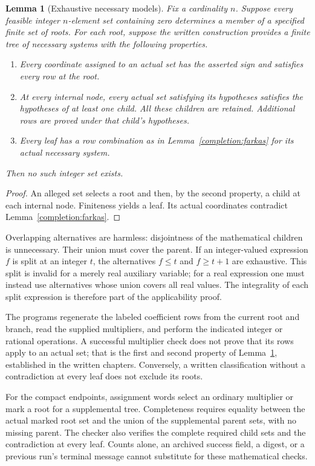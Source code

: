 \documentclass[11pt,a4paper]{article}
\newtheorem{lemma}[theorem]{Lemma}
\theoremstyle{remark}
\begin{document}
\begin{lemma}[Exhaustive necessary models]\label{completion:coverage}
Fix a cardinality $n$. Suppose every feasible integer $n$-element set
containing zero determines a member of a specified finite set of roots.
For each root, suppose the written construction provides a finite tree
of necessary systems with the following properties.
\begin{enumerate}
\item Every coordinate assigned to an actual set has the asserted sign
and satisfies every row at the root.
\item At every internal node, every actual set satisfying its hypotheses
satisfies the hypotheses of at least one child. All these children are
retained. Additional rows are proved under that child's hypotheses.
\item Every leaf has a row combination as in
Lemma~\ref{completion:farkas} for its actual necessary system.
\end{enumerate}
Then no such integer set exists.
\end{lemma}
\begin{proof}
An alleged set selects a root and then, by the second property, a child
at each internal node. Finiteness yields a leaf. Its actual coordinates
contradict Lemma~\ref{completion:farkas}.
\end{proof}

Overlapping alternatives are harmless: disjointness of the mathematical
children is unnecessary. Their union must cover the parent. If an
integer-valued expression $f$ is split at an integer $t$, the alternatives
$f\le t$ and $f\ge t+1$ are exhaustive. This split is invalid for a merely
real auxiliary variable; for a real expression one must instead use
alternatives whose union covers all real values. The integrality of each
split expression is therefore part of the applicability proof.

The programs regenerate the labeled coefficient rows from the current
root and branch, read the supplied multipliers, and perform the indicated
integer or rational operations. A successful multiplier check does not
prove that its rows apply to an actual set; that is the first and second
property of Lemma~\ref{completion:coverage}, established in the written
chapters. Conversely, a written classification without a contradiction
at every leaf does not exclude its roots.

For the compact endpoints, assignment words select an ordinary multiplier
or mark a root for a supplemental tree. Completeness requires equality
between the actual marked root set and the union of the supplemental
parent sets, with no missing parent. The checker also verifies the complete
required child sets and the contradiction at every leaf. Counts alone,
an archived success field, a digest, or a previous run's terminal message
cannot substitute for these mathematical checks.
\end{document}
